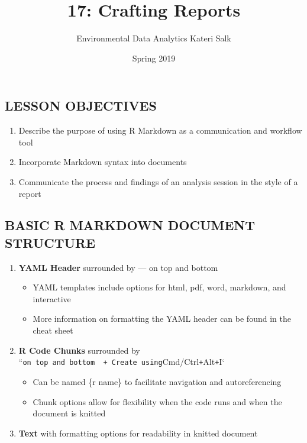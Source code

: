 \documentclass[
]{article}
\title{17: Crafting Reports}
\author{Environmental Data Analytics \textbar{} Kateri Salk}
\date{Spring 2019}
\providecommand{\tightlist}{%
  \setlength{\itemsep}{0pt}\setlength{\parskip}{0pt}}
\begin{document}
\maketitle

\hypertarget{lesson-objectives}{%
\subsection{LESSON OBJECTIVES}\label{lesson-objectives}}

\begin{enumerate}
\def\labelenumi{\arabic{enumi}.}
\tightlist
\item
  Describe the purpose of using R Markdown as a communication and
  workflow tool
\item
  Incorporate Markdown syntax into documents
\item
  Communicate the process and findings of an analysis session in the
  style of a report
\end{enumerate}

\hypertarget{basic-r-markdown-document-structure}{%
\subsection{BASIC R MARKDOWN DOCUMENT
STRUCTURE}\label{basic-r-markdown-document-structure}}

\begin{enumerate}
\def\labelenumi{\arabic{enumi}.}
\tightlist
\item
  \textbf{YAML Header} surrounded by --- on top and bottom

  \begin{itemize}
  \tightlist
  \item
    YAML templates include options for html, pdf, word, markdown, and
    interactive
  \item
    More information on formatting the YAML header can be found in the
    cheat sheet
  \end{itemize}
\item
  \textbf{R Code Chunks} surrounded by
  ``\texttt{on\ top\ and\ bottom\ \ +\ Create\ using}Cmd/Ctrl\texttt{+}Alt\texttt{+}I`

  \begin{itemize}
  \tightlist
  \item
    Can be named \{r name\} to facilitate navigation and autoreferencing
  \item
    Chunk options allow for flexibility when the code runs and when the
    document is knitted
  \end{itemize}
\item
  \textbf{Text} with formatting options for readability in knitted
  document
\end{enumerate}
\end{document}
